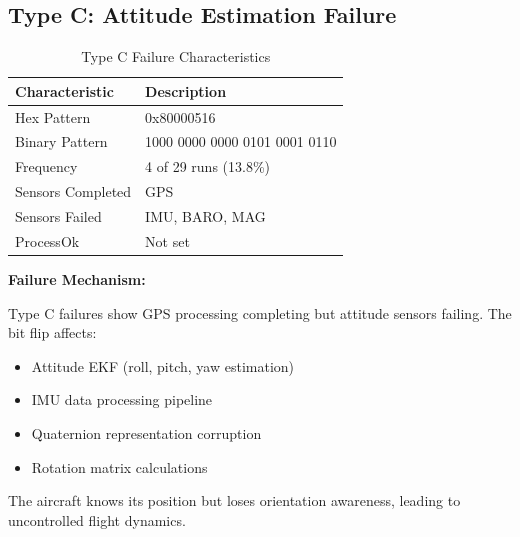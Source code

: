 \documentclass[11pt,a4paper]{article}
\begin{document}
\subsection{Type C: Attitude Estimation Failure}

\begin{table}[H]
\centering
\caption{Type C Failure Characteristics}
\label{tab:type_c}
\begin{tabular}{@{}lp{10cm}@{}}
\toprule
\textbf{Characteristic} & \textbf{Description} \\
\midrule
Hex Pattern & 0x80000516 \\
Binary Pattern & 1000 0000 0000 0101 0001 0110 \\
Frequency & 4 of 29 runs (13.8\%) \\
Sensors Completed & GPS \\
Sensors Failed & IMU, BARO, MAG \\
ProcessOk & Not set \\
\bottomrule
\end{tabular}
\end{table}

\textbf{Failure Mechanism:}

Type C failures show GPS processing completing but attitude sensors failing. The bit flip affects:

\begin{itemize}
  \item Attitude EKF (roll, pitch, yaw estimation)
  \item IMU data processing pipeline
  \item Quaternion representation corruption
  \item Rotation matrix calculations
\end{itemize}

The aircraft knows its position but loses orientation awareness, leading to uncontrolled flight dynamics.
\end{document}
